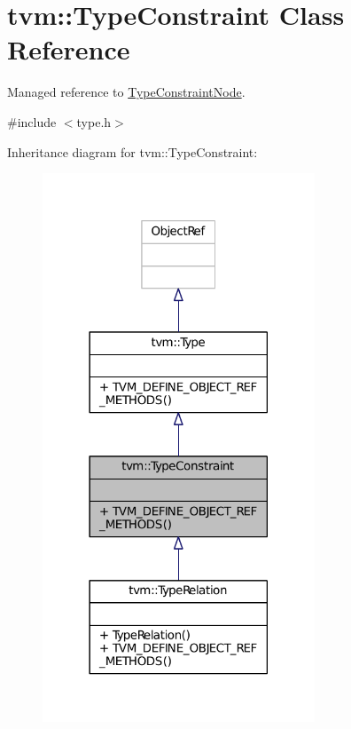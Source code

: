 \hypertarget{classtvm_1_1TypeConstraint}{}\section{tvm\+:\+:Type\+Constraint Class Reference}
\label{classtvm_1_1TypeConstraint}


Managed reference to \hyperlink{classtvm_1_1TypeConstraintNode}{Type\+Constraint\+Node}.  




{\ttfamily \#include $<$type.\+h$>$}



Inheritance diagram for tvm\+:\+:Type\+Constraint\+:
\nopagebreak
\begin{figure}[H]
\begin{center}
\leavevmode
\includegraphics[width=230pt]{classtvm_1_1TypeConstraint__inherit__graph}
\end{center}
\end{figure}


